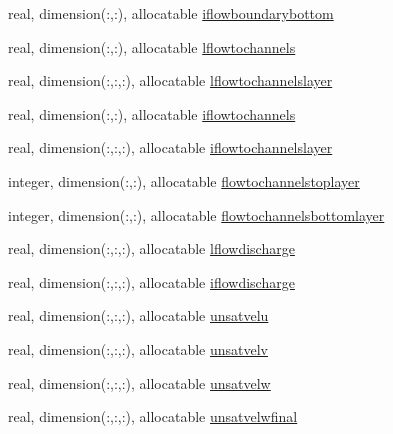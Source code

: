 \begin{DoxyCompactItemize}
\item 
real, dimension(\+:,\+:), allocatable \mbox{\hyperlink{structmoduleporousmedia_1_1t__porousmedia_ab12b5643f3a43afae7d8560629859fff}{iflowboundarybottom}}
\item 
real, dimension(\+:,\+:), allocatable \mbox{\hyperlink{structmoduleporousmedia_1_1t__porousmedia_a0f1fd317579ae22568d8342d15a2581e}{lflowtochannels}}
\item 
real, dimension(\+:,\+:,\+:), allocatable \mbox{\hyperlink{structmoduleporousmedia_1_1t__porousmedia_a24cc1b28c5c25f75315c5befa8c5245e}{lflowtochannelslayer}}
\item 
real, dimension(\+:,\+:), allocatable \mbox{\hyperlink{structmoduleporousmedia_1_1t__porousmedia_a964b22f7e733c13b7fd99dbe8bbb4f74}{iflowtochannels}}
\item 
real, dimension(\+:,\+:,\+:), allocatable \mbox{\hyperlink{structmoduleporousmedia_1_1t__porousmedia_abfb71c92ac388c536e9e1e87169fbf7e}{iflowtochannelslayer}}
\item 
integer, dimension(\+:,\+:), allocatable \mbox{\hyperlink{structmoduleporousmedia_1_1t__porousmedia_a61e61a9aaeb795c4184f060d12627dab}{flowtochannelstoplayer}}
\item 
integer, dimension(\+:,\+:), allocatable \mbox{\hyperlink{structmoduleporousmedia_1_1t__porousmedia_a45a8280ea0b4067c1c4699397c1fcc19}{flowtochannelsbottomlayer}}
\item 
real, dimension(\+:,\+:,\+:), allocatable \mbox{\hyperlink{structmoduleporousmedia_1_1t__porousmedia_acb05c66edc4a012f19d6bf2f5f2b7d23}{lflowdischarge}}
\item 
real, dimension(\+:,\+:,\+:), allocatable \mbox{\hyperlink{structmoduleporousmedia_1_1t__porousmedia_a997623f9d2b4b1413956c56986c2e2e1}{iflowdischarge}}
\item 
real, dimension(\+:,\+:,\+:), allocatable \mbox{\hyperlink{structmoduleporousmedia_1_1t__porousmedia_af9ed5e5b578c1550713d20a9dc183689}{unsatvelu}}
\item 
real, dimension(\+:,\+:,\+:), allocatable \mbox{\hyperlink{structmoduleporousmedia_1_1t__porousmedia_a5a757bbdc775a874d195b383a14d97ed}{unsatvelv}}
\item 
real, dimension(\+:,\+:,\+:), allocatable \mbox{\hyperlink{structmoduleporousmedia_1_1t__porousmedia_a3786a52db2b8b38eb8245469a3e5af8d}{unsatvelw}}
\item 
real, dimension(\+:,\+:,\+:), allocatable \mbox{\hyperlink{structmoduleporousmedia_1_1t__porousmedia_a71164a809806c9068ac97b7718c8066a}{unsatvelwfinal}}

\end{DoxyCompactItemize}
